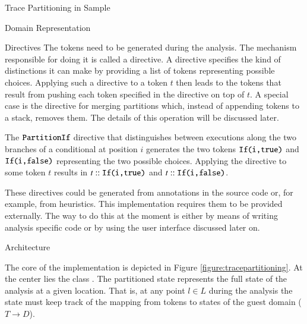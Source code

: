 \begin{chapter}{Trace Partitioning in Sample}
\begin{section}{Domain Representation}

		\begin{subsection}{Directives}
			The tokens need to be generated during the analysis. The mechanism responsible for doing it is called a directive. A directive specifies the kind of distinctions it can make by providing a list of tokens representing possible choices. Applying such a directive to a token $t$ then leads to the tokens that result from pushing each token specified in the directive on top of $t$. A special case is the directive for merging partitions which, instead of appending tokens to a stack, removes them. The details of this operation will be discussed later.

			\begin{example}[Directive]
				The $\texttt{PartitionIf}$ directive that distinguishes between executions along the two branches of a conditional at position $i$ generates the two tokens $\texttt{If(i,true)}$ and $\texttt{If(i,false)}$ representing the two possible choices. Applying the directive to some token $t$ results in $t::\texttt{If(i,true)}$ and $t::\texttt{If(i,false)}$.
				\exampleend
			\end{example}

			These directives could be generated from annotations in the source code or, for example, from heuristics. This implementation requires them to be provided externally. The way to do this at the moment is either by means of writing analysis specific code or by using the user interface discussed later on.
		\end{subsection}
	\end{section}


	\begin{section}{Architecture}
		\label{section:PartitionedState}

		The core of the implementation is depicted in Figure \ref{figure:tracepartitioning}. At the center lies the class . The partitioned state represents the full state of the analysis at a given location. That is, at any point $l \in L$ during the analysis the state must keep track of the mapping from tokens to states of the guest domain ($T \to D$).


\end{section}
\end{chapter}
